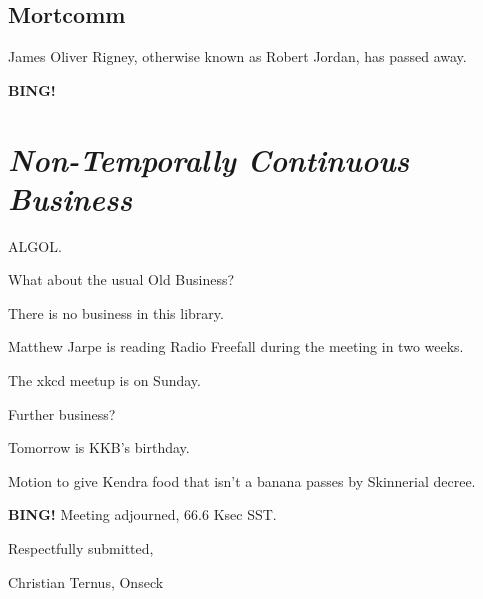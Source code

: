 \documentclass[10pt]{article}
\newcommand{\bing}{{\bf BING!} }
\newcommand{\goto}[1]{\bing \vskip 12pt \section*{{\em{#1}}}}
\begin{document}

\subsection*{Mortcomm}

James Oliver Rigney, otherwise known as Robert Jordan, has passed away.

\goto{Non-Temporally Continuous Business}

ALGOL.

What about the usual Old Business?

There is no business in this library.

Matthew Jarpe is reading Radio Freefall during the meeting in two weeks.

The xkcd meetup is on Sunday.

Further business?

Tomorrow is KKB's birthday.

Motion to give Kendra food that isn't a banana passes by Skinnerial decree.

\bing
\noindent
Meeting adjourned, 66.6 Ksec SST.

\vspace{18pt}

\centerline{Respectfully submitted,}
\centerline{Christian Ternus, Onseck}
\end{document}
